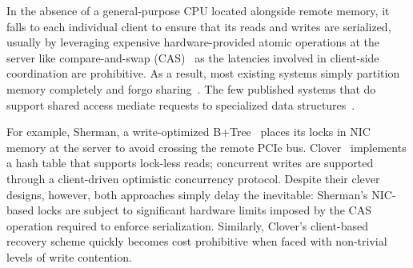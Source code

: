 

In the absence of a general-purpose CPU located alongside remote
memory, it falls to each individual client to ensure that its reads
and writes are serialized, usually by leveraging expensive
hardware-provided atomic operations at the server like
compare-and-swap (CAS)~\cite{design-guidelines} as the latencies
involved in client-side coordination are prohibitive.  As a result,
most existing systems simply partition memory completely and forgo
sharing~\cite{reigons,fastswap,legoos}.
%
The few published systems that do support shared access mediate
requests to specialized data structures~\cite{clover,sherman}.

For example, Sherman, a write-optimized
B+Tree~\cite{sherman} places its locks in NIC memory at the server to
avoid crossing the remote PCIe bus.
Clover~\cite{clover} implements a hash table that
supports lock-less reads; concurrent writes are supported through a
client-driven optimistic concurrency protocol.  Despite their clever
designs, however, both approaches simply delay the inevitable:
Sherman's NIC-based locks are subject to significant hardware limits
imposed by the CAS operation required to enforce serialization.
Similarly, Clover's client-based recovery scheme quickly becomes cost
prohibitive when faced with non-trivial levels of write contention.
%

